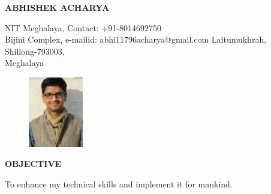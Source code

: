 \documentclass{article}
\begin{document}
	
	\begin{center}
		{
			\large\textbf{ABHISHEK ACHARYA}
		}
		
	\end{center}
	
	\begin{flushleft}
		NIT Meghalaya, 		\hspace{2.8in}    		    Contact: +91-8014692750            \\
		Bijini Complex, 		\hspace{2.85in}		    e-mailid: abhi11796acharya@gmail.com
		Laitumukhrah, \\
		Shillong-793003,     \\
		Meghalaya       \\
	\end{flushleft}
	\vspace{-0.3in}
	
	\begin{figure}[h]
		\hspace{4.4in}
		\includegraphics[width=90px]{Abhishek}
	\end{figure}
	
	\begin{flushleft}
		\textbf{OBJECTIVE}
		
		\vspace{-0.20in}
		\hspace{1.5in}
		To enhance my technical skills and implement it for mankind.\\
	\end{flushleft}
	
\end{document}

